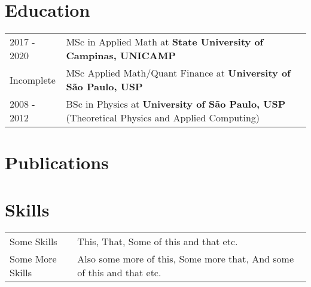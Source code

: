 \documentclass[a4paper,12pt]{article}
\begin{document}
\section{Education}
\begin{tabularx}{\linewidth}{@{}l X@{}}
2017 - 2020 & MSc in Applied Math at \textbf{State University of Campinas, UNICAMP} \\
Incomplete & MSc Applied Math/Quant Finance at \textbf{University of São Paulo, USP}  \\
2008 - 2012 & BSc in Physics at \textbf{University of São Paulo, USP} \hfill (Theoretical Physics and Applied Computing) \\
\end{tabularx}

\section{Publications}
\begin{refsection}
\nocite{*}
\printbibliography[heading=none]
\end{refsection}

\section{Skills}
\begin{tabularx}{\linewidth}{@{}l X@{}}
Some Skills &  \normalsize{This, That, Some of this and that etc.}\\
Some More Skills  &  \normalsize{Also some more of this, Some more that, And some of this and that etc.}\\  
\end{tabularx}

\vfill
{}
\end{document}
